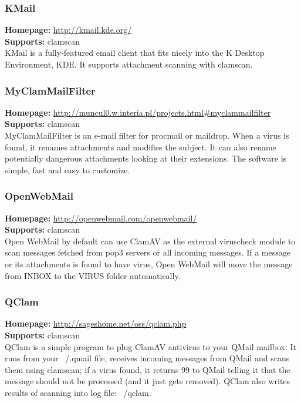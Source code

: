 \documentclass[a4paper,titlepage,12pt]{article}
\begin{document}
    \subsubsection{KMail}
    \textbf{Homepage:} \url{http://kmail.kde.org/}\\
    \textbf{Supports:} clamscan\\[4pt]
    KMail is a fully-featured email client that fits nicely into the K Desktop
    Environment, KDE. It supports attachment scanning with clamscan.

    \subsubsection{MyClamMailFilter}
    \textbf{Homepage:} \url{http://muncul0.w.interia.pl/projects.html#myclammailfilter}\\
    \textbf{Supports:} clamscan\\[4pt]
    MyClamMailFilter is an e-mail filter for procmail or maildrop.
    When a virus is found, it renames attachments and modifies the subject.
    It can also rename potentially dangerous attachments looking at their
    extensions. The software is simple, fast and easy to customize.

    \subsubsection{OpenWebMail}
    \textbf{Homepage:} \url{http://openwebmail.com/openwebmail/}\\
    \textbf{Supports:} clamscan\\[4pt]
    Open WebMail by default can use ClamAV as the external viruscheck module
    to scan messages fetched from pop3 servers or all incoming messages. If a
    message or its attachments is found to have virus, Open WebMail will move
    the message from INBOX to the VIRUS folder automatically.

    \subsubsection{QClam}
    \textbf{Homepage:} \url{http://sageshome.net/oss/qclam.php}\\
    \textbf{Supports:} clamscan\\[4pt]
    QClam is a simple program to plug ClamAV antivirus to your QMail mailbox.
    It runs from your ~/.qmail file, receives incoming messages from QMail and
    scans them using clamscan; if a virus found, it returns 99 to QMail telling
    it that the message should not be processed (and it just gets removed).
    QClam also writes results of scanning into log file: ~/qclam.
\end{document}
